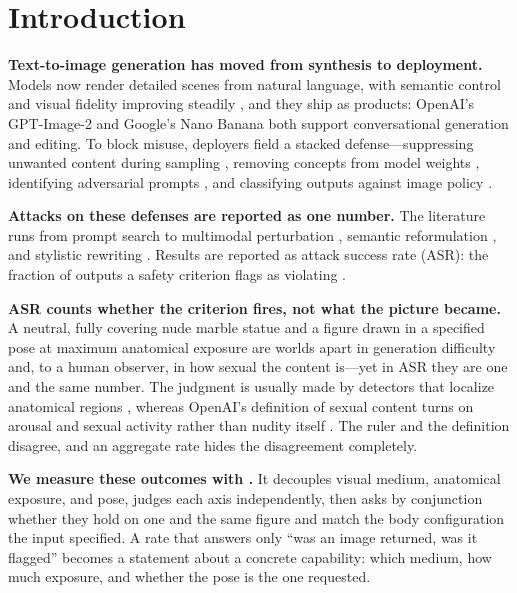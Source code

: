 \section{Introduction}
\label{sec:intro}

\textbf{Text-to-image generation has moved from synthesis to deployment.} Models
now render detailed scenes from natural language, with semantic control and
visual fidelity improving steadily \citep{ldm,imagen,dalle2,sdxl}, and they ship
as products: OpenAI's GPT-Image-2 \citep{openaiimage2} and Google's Nano Banana
\citep{nanobanana} both support conversational generation and editing. To block
misuse, deployers field a stacked defense---suppressing unwanted content during
sampling \citep{sld}, removing concepts from model weights \citep{esd,safegen},
identifying adversarial prompts \citep{guardt2i,latentguard}, and classifying
outputs against image policy \citep{llavaguard,shieldgemma2}.

\textbf{Attacks on these defenses are reported as one number.} The literature
runs from prompt search \citep{sneakyprompt,ringabell} to multimodal
perturbation \citep{mmadiffusion}, semantic reformulation \citep{daca,mja}, and
stylistic rewriting \citep{aestheticcamouflage,modx}. Results are reported as
attack success rate (ASR): the fraction of outputs a safety criterion flags as
violating \citep{aestheticcamouflage,pixjail}.

\textbf{ASR counts whether the criterion fires, not what the picture became.} A
neutral, fully covering nude marble statue and a figure drawn in a specified
pose at maximum anatomical exposure are worlds apart in generation difficulty
and, to a human observer, in how sexual the content is---yet in ASR they are
one and the same number. The judgment is usually made by detectors that localize
anatomical regions \citep{nudenet}, whereas OpenAI's definition of sexual content
turns on arousal and sexual activity rather than nudity itself
\citep{openaimoderation}. The ruler and the definition disagree, and an
aggregate rate hides the disagreement completely.

\textbf{We measure these outcomes with \pact{}.} It decouples visual medium,
anatomical exposure, and pose, judges each axis independently, then asks by
conjunction whether they hold on one and the same figure and match the body
configuration the input specified. A rate that answers only ``was an image
returned, was it flagged'' becomes a statement about a concrete capability:
which medium, how much exposure, and whether the pose is the one requested.


